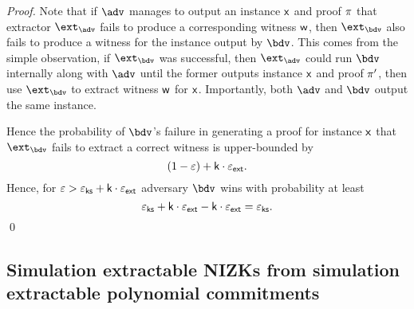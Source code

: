 \documentclass[runningheads,11pt]{llncs}
\begin{document}
{\begin{proof}
  Note that if $\adv$ manages to output an instance $\mathsf{x}$ and proof $\pi$
  that extractor $\ext_\adv$ fails to produce a corresponding witness $\mathsf{w}$,
  then $\ext_\bdv$ also fails to produce a witness for the instance output by
  $\bdv$. This comes from the simple observation, if $\ext_\bdv$ was successful,
  then $\ext_\adv$ could run $\bdv$ internally along with $\adv$ until the former
  outputs instance $\mathsf{x}$ and proof $\pi'$, then use $\ext_\bdv$ to extract
  witness $\mathsf{w}$ for $\mathsf{x}$. Importantly, both $\adv$ and $\bdv$ output the same instance.

  Hence the probability of $\bdv$'s failure in generating a proof for instance
  $\mathsf{x}$ that $\ext_\bdv$ fails to extract a correct witness is upper-bounded by
  \[
    (1 - \varepsilon) + \mathsf{k} \cdot \varepsilon_{\mathsf{ext}}.
  \]
  Hence, for $\varepsilon > \varepsilon_{\mathsf{ks}} + \mathsf{k} \cdot \varepsilon_{\mathsf{ext}}$ adversary $\bdv$ wins with probability at least
  \[
    \varepsilon_{\mathsf{ks}} + \mathsf{k} \cdot \varepsilon_{\mathsf{ext}} - \mathsf{k} \cdot \varepsilon_{\mathsf{ext}}  = \varepsilon_{\mathsf{ks}}.
  \]
  \qed
\end{proof}
}

\subsection{Simulation extractable NIZKs from simulation extractable polynomial
  commitments}
\end{document}
